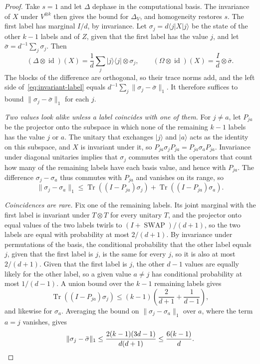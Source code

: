 \documentclass[11pt,letterpaper]{article}
\theoremstyle{definition}\newtheorem{definition}[theorem]{Definition}
\newcommand{\Tr}{\operatorname{Tr}}
\newcommand{\ket}[1]{\lvert#1\rangle}
\newcommand{\bra}[1]{\langle#1\rvert}
\newcommand{\proj}[1]{\ket{#1}\!\bra{#1}}
\newcommand{\norm}[1]{\lVert#1\rVert}
\newcommand{\id}{\operatorname{id}}
\begin{document}
\begin{proof}
Take $s=1$ and let $\Delta$ dephase in the computational basis. The
invariance of $X$ under $V^{\otimes k}$ then gives the bound for
$\Delta_V$, and homogeneity restores $s$. The first label has marginal
$I/d$, by invariance. Let $\sigma_j=d\bra jX\ket j$ be the state of the
other $k-1$ labels and of $Z$, given that the first label has the value
$j$, and let $\bar\sigma=d^{-1}\sum_j\sigma_j$. Then
\[
 (\Delta\otimes\id)(X)=\frac1d\sum_j\proj j\otimes\sigma_j,
 \qquad
 (\Omega\otimes\id)(X)=\frac Id\otimes\bar\sigma .
\]
The blocks of the difference are orthogonal, so their trace norms add,
and the left side of~\eqref{eq:invariant-label} equals
$d^{-1}\sum_j\norm{\sigma_j-\bar\sigma}_1$. It therefore suffices to
bound $\norm{\sigma_j-\bar\sigma}_1$ for each $j$.

\emph{Two values look alike unless a label coincides with one of
them.} For $j\ne a$, let $P_{ja}$ be the projector onto the subspace in
which none of the remaining $k-1$ labels has the value $j$ or $a$. The
unitary that exchanges $\ket j$ and $\ket a$ acts as the identity on
this subspace, and $X$ is invariant under it, so
$P_{ja}\sigma_jP_{ja}=P_{ja}\sigma_aP_{ja}$. Invariance under diagonal
unitaries implies that $\sigma_j$ commutes with the operators that
count how many of the remaining labels have each basis value, and hence
with $P_{ja}$. The difference $\sigma_j-\sigma_a$ thus commutes with
$P_{ja}$ and vanishes on its range, so
\[
 \norm{\sigma_j-\sigma_a}_1
 \le\Tr((I-P_{ja})\sigma_j)+\Tr((I-P_{ja})\sigma_a).
\]

\emph{Coincidences are rare.} Fix one of the remaining labels. Its
joint marginal with the first label is invariant under $T\otimes T$ for
every unitary $T$, and the projector onto equal values of the two
labels twirls to $(I+\operatorname{SWAP})/(d+1)$, so the two labels are
equal with probability at most $2/(d+1)$. By invariance under
permutations of the basis, the conditional probability that the other
label equals $j$, given that the first label is $j$, is the same for
every $j$, so it is also at most $2/(d+1)$. Given that the first label
is $j$, the other $d-1$ values are equally likely for the other label,
so a given value $a\ne j$ has conditional probability at most
$1/(d-1)$. A union bound
over the $k-1$ remaining labels gives
\[
 \Tr((I-P_{ja})\sigma_j)
 \le(k-1)\left(\frac2{d+1}+\frac1{d-1}\right),
\]
and likewise for $\sigma_a$. Averaging the bound on
$\norm{\sigma_j-\sigma_a}_1$ over $a$, where the term $a=j$ vanishes,
gives
\[
 \norm{\sigma_j-\bar\sigma}_1
 \le\frac{2(k-1)(3d-1)}{d(d+1)}\le\frac{6(k-1)}d. \qedhere
\]
\end{proof}
\end{document}
